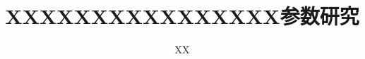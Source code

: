 \documentclass[master,chinese,pdf,AutoFakeFont=true]{ustcthesis}
\title{XXXXXXXXXXXXXXXX参数研究}
\author{XX}XX
\begin{document}
\maketitle


%

\frontmatter

{
\linespread{1.25}\selectfont%
\tableofcontents
\listoffigures
\listoftables
}
% 

\newtheorem{proof_idea}{证明思路}
\newtheorem{thm}{定理}

\mainmatter
% 












\backmatter



\end{document}
